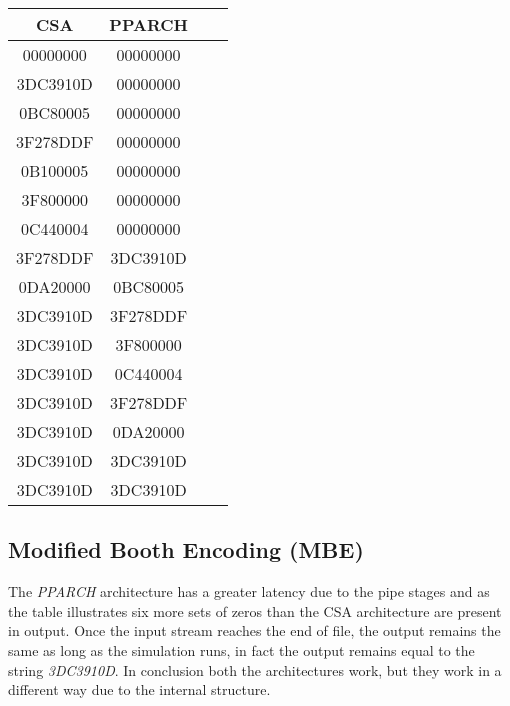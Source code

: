 \begin{table}[H]
\begin{center}
\begin{tabular}{|c|c|c|c|}				\hline
CSA		 	  & PPARCH 					\\ \hline
00000000   	  & 00000000               	\\ \hline
3DC3910D      & 00000000                \\ \hline
0BC80005      & 00000000                \\ \hline
3F278DDF      & 00000000                \\ \hline
0B100005      & 00000000                  \\ \hline
3F800000      & 00000000                  \\ \hline
0C440004      & 00000000                   \\ \hline
3F278DDF      & 3DC3910D                  \\ \hline
0DA20000      & 0BC80005                   \\ \hline
3DC3910D      & 3F278DDF                  \\ \hline
3DC3910D      & 3F800000                   \\ \hline
3DC3910D      & 0C440004                   \\ \hline
3DC3910D      & 3F278DDF                   \\ \hline
3DC3910D      & 0DA20000                   \\ \hline
3DC3910D      & 3DC3910D                   \\ \hline
3DC3910D      & 3DC3910D                   \\ \hline
\end{tabular}
\end{center}
\end{table}

\subsection{Modified Booth Encoding (MBE)}
The \textit{PPARCH} architecture has a greater latency due to the pipe stages and as the table illustrates six more sets of zeros than the CSA architecture are present in output. Once the input stream reaches the end of file, the output remains the same as long as the simulation runs, in fact the output remains equal to the string \textit{3DC3910D}. In conclusion both the architectures work, but they work in a different way due to the internal structure.

